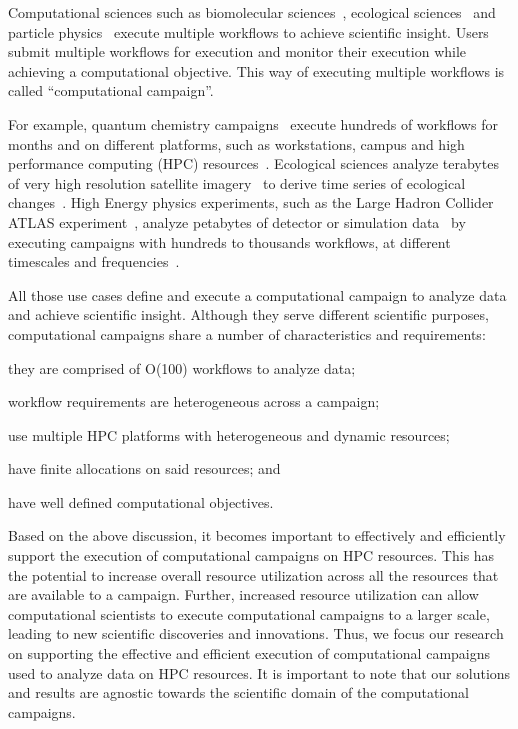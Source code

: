 
Computational sciences such as biomolecular sciences~\cite{cheatham2015impact,
dakka2018concurrent}, ecological sciences~\cite{goncalves2020sealnet,
paraskevakos2019workflow} and particle physics~\cite{atlas} execute multiple
workflows to achieve scientific insight. Users submit multiple workflows for
execution and monitor their execution while achieving a computational objective.
This way of executing multiple workflows is called ``computational campaign''.

For example, quantum chemistry campaigns~\cite{smith2020molssi} execute hundreds
of workflows for months and on different platforms, such as workstations, campus
and high performance computing (HPC) resources~\cite{smith2020molssi}.
Ecological sciences analyze terabytes of very high resolution satellite
imagery~\cite{goncalves2020sealnet} to derive time series of ecological
changes~\cite{paraskevakos2019workflow}. High Energy physics experiments, such
as the Large Hadron Collider ATLAS experiment~\cite{atlas}, analyze petabytes of
detector or simulation data~\cite{borodin2015big} by executing campaigns with
hundreds to thousands workflows, at different timescales and
frequencies~\cite{borodin2015big}.

All those use cases define and execute a computational campaign to analyze data
and achieve scientific insight. Although they serve different scientific
purposes, computational campaigns share a number of characteristics and
requirements:
\begin{inparaenum}[(1)]
    \item they are comprised of O(100) workflows to analyze data;
    \item workflow requirements are heterogeneous across a campaign;
    \item use multiple HPC platforms with heterogeneous and dynamic resources;
    \item have finite allocations on said resources; and
    \item have well defined computational objectives.
\end{inparaenum}

Based on the above discussion, it becomes important to effectively and
efficiently support the execution of computational campaigns on HPC resources.
This has the potential to increase overall resource utilization across all the
resources that are available to a campaign. Further, increased resource
utilization can allow computational scientists to execute computational
campaigns to a larger scale, leading to new scientific discoveries and
innovations. Thus, we focus our research on supporting the effective and
efficient execution of computational campaigns used to analyze data on HPC
resources. It is important to note that our solutions and results are agnostic
towards the scientific domain of the computational campaigns.

